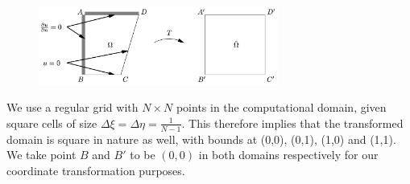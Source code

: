 \begin{figure}[h!]
\centering
\includegraphics[width=0.7\textwidth]{figures/prj1_qn1_coordtransform.png}\\
\caption{}
\label{prj1_qn1_coordtransform}
\end{figure}

We use a regular grid with $N\times N$ points in the computational domain, given square cells of size $\Delta\xi = \Delta\eta = \frac{1}{N-1}$.  This therefore implies that the transformed domain is square in nature as well, with bounds at (0,0), (0,1), (1,0) and (1,1).  We take point $B$ and $B'$ to be $(0,0)$ in both domains respectively for our coordinate transformation purposes.

